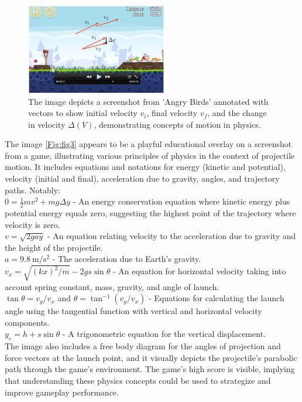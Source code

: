 \documentclass[12pt, titlepage]{article}
\begin{document}
\begin{figure}[H]
\centering
\includegraphics[width=0.55\textwidth]{fig2.png}
\caption{The image depicts a screenshot from 'Angry Birds' annotated with vectors to show initial velocity $v_i$, final velocity $v_f$, and the change in velocity $\Delta(V)$, demonstrating concepts of motion in physics.}
\label{Fig:fig2}
\end{figure}

The image \ref{Fig:fig3} appears to be a playful educational overlay on a screenshot from a game, illustrating various principles of physics in the context of projectile motion. It includes equations and notations for energy (kinetic and potential), velocity (initial and final), acceleration due to gravity, angles, and trajectory paths. Notably:
\\

$0=\frac{1}{2} m v^2+m g \Delta y$ - An energy conservation equation where kinetic energy plus potential energy equals zero, suggesting the highest point of the trajectory where velocity is zero.\\
$v=\sqrt{2 g a y}$ - An equation relating velocity to the acceleration due to gravity and the height of the projectile. \\

$a=9.8 \mathrm{~m} / \mathrm{s}^2$ - The acceleration due to Earth's gravity. \\
$v_x=\sqrt{(k x)^2 / m}-2 g s \sin \theta$ - An equation for horizontal velocity taking into account spring constant, mass, gravity, and angle of launch. \\
$\tan \theta=v_y / v_x$ and $\theta=\tan ^{-1}\left(v_y / v_x\right)$ - Equations for calculating the launch angle using the tangential function with vertical and horizontal velocity components. \\
$y_e=h+s \sin \theta$ - A trigonometric equation for the vertical displacement. \\

The image also includes a free body diagram for the angles of projection and force vectors at the launch point, and it visually depicts the projectile's parabolic path through the game's environment. The game's high score is visible, implying that understanding these physics concepts could be used to strategize and improve gameplay performance.
\end{document}
